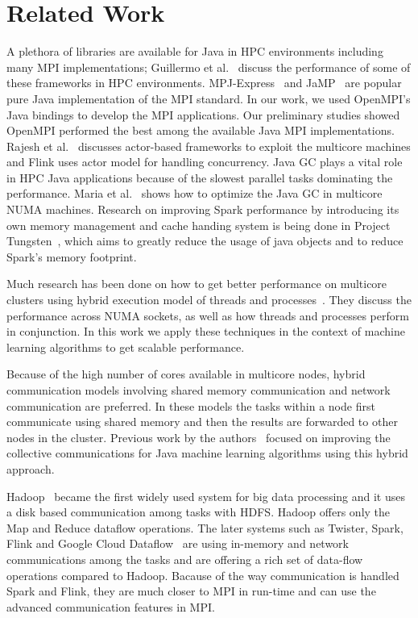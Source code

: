 \documentclass[10pt, conference, compsocconf]{IEEEtran}
\begin{document}
\section{Related Work} \label{sec:related}
A plethora of libraries are available for Java in \ac{HPC} environments including many \ac{MPI} implementations; Guillermo et al.~\cite{taboada2013java} discuss the performance of some of these frameworks in \ac{HPC} environments. MPJ-Express~\cite{baker2006mpj} and JaMP~\cite{klemm2007jamp} are popular pure Java implementation of the \ac{MPI} standard. In our work, we used OpenMPI's Java bindings to develop the \ac{MPI} applications. Our preliminary studies showed OpenMPI performed the best among the available Java \ac{MPI} implementations. Rajesh et al.~\cite{karmani2009actor} discusses actor-based frameworks to exploit the multicore machines and Flink uses actor model for handling concurrency. Java \ac{GC} plays a vital role in \ac{HPC} Java applications because of the slowest parallel tasks dominating the performance. Maria et al.~\cite{carpen2015performance} shows how to optimize the Java \ac{GC} in multicore \ac{NUMA} machines. Research on improving Spark performance by introducing its own memory management and cache handing system is being done in Project Tungsten~\cite{tungsten}, which aims to greatly reduce the usage of java objects and to reduce Spark's memory footprint. 

Much research has been done on how to get better performance on multicore clusters using hybrid execution model of threads and processes~\cite{chorley2010performance, rabenseifner2009hybrid, camp2011streamline}. They discuss the performance across NUMA sockets, as well as how threads and processes perform in conjunction. In this work we apply these techniques in the context of machine learning algorithms to get scalable performance.

Because of the high number of cores available in multicore nodes, hybrid communication models involving shared memory communication and network communication are preferred. In these models the tasks within a node first communicate using shared memory and then the results are forwarded to other nodes in the cluster. Previous work by the authors~\cite{hpc2016:spidaljava} focused on improving the collective communications for Java machine learning algorithms using this hybrid approach. 

Hadoop~\cite{lam2010hadoop} became the first widely used system for big data processing and it uses a disk based communication among tasks with HDFS. Hadoop offers only the Map and Reduce  dataflow operations. The later systems such as Twister, Spark, Flink and Google Cloud Dataflow~\cite{akidau2015dataflow} are using in-memory and network communications among the tasks and are offering a rich set of data-flow operations compared to Hadoop. Bacause of the way communication is handled Spark and Flink, they are much closer to \ac{MPI} in run-time and can use the advanced communication features in MPI. 
\end{document}
